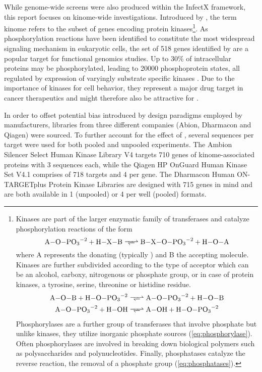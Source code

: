 While genome-wide  screens were also produced within the InfectX framework, this report focuses on kinome-wide investigations. Introduced by \citet{Manning2002}, the term kinome refers to the subset of genes encoding protein kinases\footnote{Kinases are part of the larger enzymatic family of transferases and catalyze phosphorylation reactions of the form
\begin{equation}
  \ce{A\bond{-}O\bond{-}PO3^{-2} + H\bond{-}X\bond{-}B <=>> B\bond{-}X\bond{-}O\bond{-}PO3^{-2} + H\bond{-}O\bond{-}A} \label{eq:kinase}
\end{equation}
where A represents the donating (typically ) and B the accepting molecule. Kinases are further subdivided according to the type of acceptor which can be an alcohol, carboxy, nitrogenous or phosphate group, or in case of protein kinases, a tyrosine, serine, threonine or histidine residue.
\begin{align}
  \ce{A\bond{-}O\bond{-}B + H\bond{-}O\bond{-}PO3^{-2} &<=>> A\bond{-}O\bond{-}PO3^{-2} + H\bond{-}O\bond{-}B} \label{eq:phosphorylase} \\
  \ce{A\bond{-}O\bond{-}PO3^{-2} + H\bond{-}OH &<=>> A\bond{-}OH + H\bond{-}O\bond{-}PO3^{-2}} \label{eq:phosphatases}
\end{align}
Phosphorylases are a further group of transferases that involve phosphate but unlike kinases, they utilize inorganic phosphate sources (\ref{eq:phosphorylase}). Often phosphorylases are involved in breaking down biological polymers such as polysaccharides and polynucleotides. Finally, phosphatases catalyze the reverse reaction, the removal of a phosphate group (\ref{eq:phosphatases}).}. As phosphorylation reactions have been identified to constitute the most widespread signaling mechanism in eukaryotic cells, the set of 518 genes identified by \citeauthor{Manning2002} are a popular target for functional genomics studies. Up to 30\% of intracellular proteins may be phosphorylated, leading to 20000 phosphoprotein states, all regulated by expression of varyingly substrate specific kinases \citep{Johnson2005}. Due to the importance of kinases for cell behavior, they represent a major drug target in cancer therapeutics and might therefore also be attractive for .

In order to offset potential bias introduced by  design paradigms employed by manufacturers, libraries from three different companies (Abion, Dharmacon and Qiagen) were sourced. To further account for the effect of , several  sequences per target were used for both pooled and unpooled experiments. The Ambion Silencer Select Human Kinase  Library V4 targets 710 genes of kinome-associated proteins with 3 sequences each, while the Qiagen HP OnGuard Human Kinase  Set V4.1 comprises of 718 targets and 4  per gene. The Dharmacon Human ON-TARGETplus  Protein Kinase Libraries are designed with 715 genes in mind and are both available in 1  (unpooled) or 4  per well (pooled) formats.

